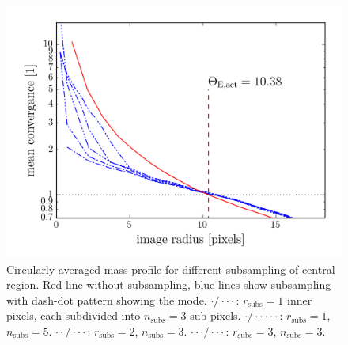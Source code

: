\documentclass[fleqn,usenatbib]{mnras}
\begin{document}
\begin{figure}
  \includegraphics[width=\linewidth]{hires/007022_kappa_encl}
  \caption{
    Circularly averaged mass profile for different subsampling of central region.
    Red line without subsampling, blue lines show subsampling with dash-dot pattern showing the mode.
    $\cdot / \cdot \cdot \cdot$: $r_\text{subs}=1$ inner pixels, each subdivided into $n_\text{subs}=3$ sub pixels.
    $\cdot / \cdot \cdot \cdot \cdot \cdot$: $r_\text{subs}=1$, $n_\text{subs}=5$.
    $\cdot \cdot / \cdot \cdot \cdot $: $r_\text{subs}=2$, $n_\text{subs}=3$.
    $\cdot \cdot \cdot / \cdot \cdot \cdot $: $r_\text{subs}=3$, $n_\text{subs}=3$.
    }
  \label{fig:subsampling}
\end{figure}
\end{document}
